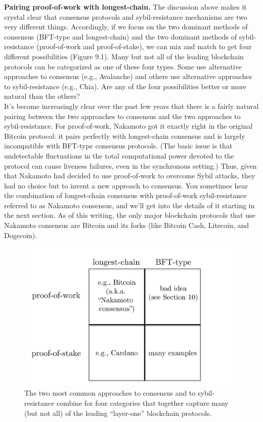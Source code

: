 \noindent
\textbf{Pairing proof-of-work with longest-chain.} The discussion above makes it
crystal clear that consensus protocols and sybil-resistance mechanisms are two very different
things. Accordingly, if we focus on the two dominant methods of consensus (BFT-type and
longest-chain) and the two dominant methods of sybil-resistance (proof-of-work and proof-of-stake), we can mix and match to get four different possibilities (Figure 9.1). Many but not all of the leading blockchain protocols can be categorized as one of these four types.
Some use alternative approaches to consensus (e.g., Avalanche) and others use alternative approaches to
sybil-resistance (e.g., Chia). Are any of
the four possibilities better or more natural than the others?\\

It’s become increasingly clear over the past few years that there is a fairly natural pairing between the two approaches to consensus and the two approaches to sybil-resistance.
For proof-of-work, Nakamoto got it exactly right in the original Bitcoin protocol: it pairs
perfectly with longest-chain consensus and is largely
incompatible with BFT-type consensus protocols. (The basic issue is that undetectable fluctuations in the total computational power devoted to the
protocol can cause liveness failures, even in the synchronous setting.) Thus, given that Nakamoto had decided to use proof-of-work to overcome Sybil attacks, they had no choice but to invent a
new approach to consensus. You sometimes hear the combination of longest-chain consensus
with proof-of-work sybil-resistance referred to as Nakamoto consensus, and we’ll get into
the details of it starting in the next section. As of this writing, the only major blockchain
protocols that use Nakamoto consensus are Bitcoin and its forks (like Bitcoin Cash, Litecoin,
and Dogecoin).
\begin{figure}[h]
    \centering
    \includegraphics[scale = 0.5]{figures/f35.png}
    \caption{The two most common approaches to consensus and to sybil-resistance combine for
four categories that together capture many (but not all) of the leading “layer-one” blockchain
protocols.}
    \label{fig:mesh1}
\end{figure}\\
